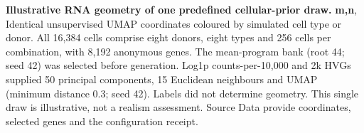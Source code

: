 \textbf{Illustrative RNA geometry of one predefined cellular-prior draw.} \textbf{m,n}, Identical unsupervised UMAP coordinates coloured by simulated cell type or donor. All 16,384 cells comprise eight donors, eight types and 256 cells per combination, with 8,192 anonymous genes. The mean-program bank (root 44; seed 42) was selected before generation. Log1p counts-per-10,000 and 2k HVGs supplied 50 principal components, 15 Euclidean neighbours and UMAP (minimum distance 0.3; seed 42). Labels did not determine geometry. This single draw is illustrative, not a realism assessment. Source Data provide coordinates, selected genes and the configuration receipt.
